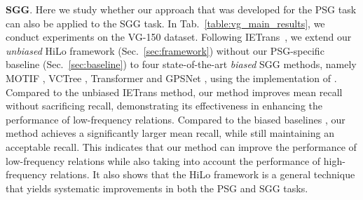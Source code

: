 \noindent \textbf{SGG}.
Here we study whether our approach that was developed for the PSG task can also be applied to the SGG task.
In Tab.~\ref{table:vg_main_results}, we conduct experiments on the VG-150 dataset.
Following IETrans~\cite{zhang2022fine}, we extend our \emph{unbiased} HiLo framework (Sec.~\ref{sec:framework}) without our PSG-specific baseline (Sec.~\ref{sec:baseline}) to four state-of-the-art \emph{biased} SGG methods, namely MOTIF \cite{zellers2018neural}, VCTree \cite{tang2019learning}, Transformer \cite{tang2020unbiased} and GPSNet \cite{lin2020gps}, using the implementation of \cite{zhang2022fine}.
Compared to the unbiased IETrans \cite{zhang2022fine} method, our method improves mean recall without sacrificing recall, demonstrating its effectiveness in enhancing the performance of low-frequency relations.
Compared to the biased baselines \cite{zellers2018neural, tang2019learning, tang2020unbiased, lin2020gps}, our method achieves a significantly larger mean recall, while still maintaining an acceptable recall.
This indicates that our method can improve the performance of low-frequency relations while also taking into account the performance of high-frequency relations.
It also shows that the HiLo framework is a general technique that yields systematic improvements in both the PSG and SGG tasks.

